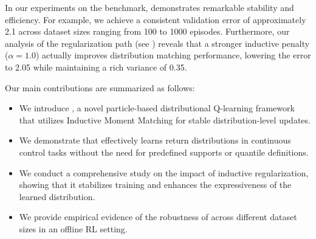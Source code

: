 In our experiments on the \halfcheetah benchmark, \immq demonstrates remarkable stability and efficiency. For example, we achieve a consistent \mmd validation error of approximately 2.1 across dataset sizes ranging from 100 to 1000 episodes. Furthermore, our analysis of the regularization path (see ) reveals that a stronger inductive penalty ($\alpha=1.0$) actually improves distribution matching performance, lowering the \mmd error to 2.05 while maintaining a rich variance of 0.35.

Our main contributions are summarized as follows:
\begin{itemize}[leftmargin=*,itemsep=0pt,topsep=0pt]
    \item We introduce \immq, a novel particle-based distributional Q-learning framework that utilizes Inductive Moment Matching for stable distribution-level updates.
    \item We demonstrate that \immq effectively learns return distributions in continuous control tasks without the need for predefined supports or quantile definitions.
    \item We conduct a comprehensive study on the impact of inductive regularization, showing that it stabilizes training and enhances the expressiveness of the learned distribution.
    \item We provide empirical evidence of the robustness of \immq across different dataset sizes in an offline RL setting.
\end{itemize}
